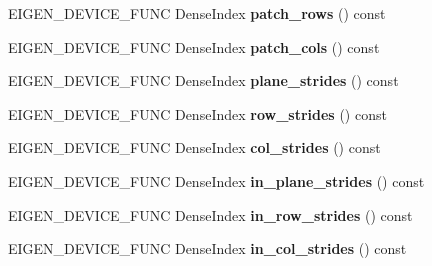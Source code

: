 \begin{DoxyCompactItemize}
\mbox{\label{class_eigen_1_1_tensor_volume_patch_op_ae5d5a1fd280f5c7f1f6e6313f8f43b50}} 
E\+I\+G\+E\+N\+\_\+\+D\+E\+V\+I\+C\+E\+\_\+\+F\+U\+NC Dense\+Index {\bfseries patch\+\_\+rows} () const
\item 
\mbox{\label{class_eigen_1_1_tensor_volume_patch_op_ae0dbc8f349fd171b2fc59a07b1582b62}} 
E\+I\+G\+E\+N\+\_\+\+D\+E\+V\+I\+C\+E\+\_\+\+F\+U\+NC Dense\+Index {\bfseries patch\+\_\+cols} () const
\item 
\mbox{\label{class_eigen_1_1_tensor_volume_patch_op_a05afb9a406a9a8ca58c4105c3bc63e44}} 
E\+I\+G\+E\+N\+\_\+\+D\+E\+V\+I\+C\+E\+\_\+\+F\+U\+NC Dense\+Index {\bfseries plane\+\_\+strides} () const
\item 
\mbox{\label{class_eigen_1_1_tensor_volume_patch_op_a8624b86945a5d22eaca15010f9094cda}} 
E\+I\+G\+E\+N\+\_\+\+D\+E\+V\+I\+C\+E\+\_\+\+F\+U\+NC Dense\+Index {\bfseries row\+\_\+strides} () const
\item 
\mbox{\label{class_eigen_1_1_tensor_volume_patch_op_a3d36f431162ace90c6fd88c2c099d6eb}} 
E\+I\+G\+E\+N\+\_\+\+D\+E\+V\+I\+C\+E\+\_\+\+F\+U\+NC Dense\+Index {\bfseries col\+\_\+strides} () const
\item 
\mbox{\label{class_eigen_1_1_tensor_volume_patch_op_a7649aeb8e06d893f3a89f444882b6ccc}} 
E\+I\+G\+E\+N\+\_\+\+D\+E\+V\+I\+C\+E\+\_\+\+F\+U\+NC Dense\+Index {\bfseries in\+\_\+plane\+\_\+strides} () const
\item 
\mbox{\label{class_eigen_1_1_tensor_volume_patch_op_a09e2dca0c18334d9c680291d55d0215f}} 
E\+I\+G\+E\+N\+\_\+\+D\+E\+V\+I\+C\+E\+\_\+\+F\+U\+NC Dense\+Index {\bfseries in\+\_\+row\+\_\+strides} () const
\item 
\mbox{\label{class_eigen_1_1_tensor_volume_patch_op_acf7081fc28c88e5444c0264b721d4001}} 
E\+I\+G\+E\+N\+\_\+\+D\+E\+V\+I\+C\+E\+\_\+\+F\+U\+NC Dense\+Index {\bfseries in\+\_\+col\+\_\+strides} () const
\item 

\end{DoxyCompactItemize}
